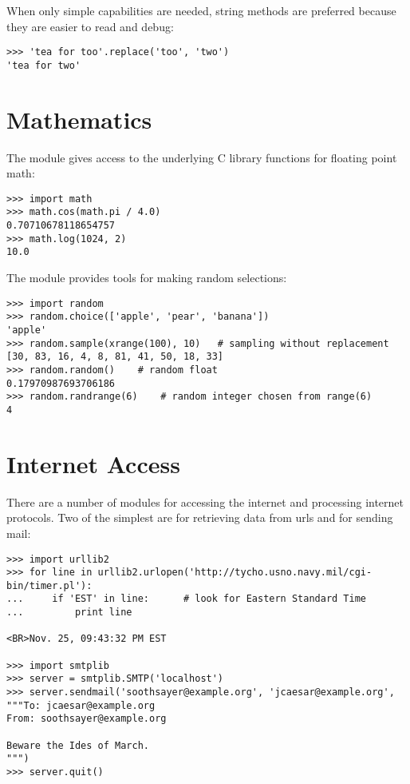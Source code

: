 \documentclass{manual}
\begin{document}
When only simple capabilities are needed, string methods are preferred
because they are easier to read and debug:

\begin{verbatim}
>>> 'tea for too'.replace('too', 'two')
'tea for two'
\end{verbatim}

\section{Mathematics\label{mathematics}}

The  module gives
access to the underlying C library functions for floating point math:

\begin{verbatim}
>>> import math
>>> math.cos(math.pi / 4.0)
0.70710678118654757
>>> math.log(1024, 2)
10.0
\end{verbatim}

The 
module provides tools for making random selections:

\begin{verbatim}
>>> import random
>>> random.choice(['apple', 'pear', 'banana'])
'apple'
>>> random.sample(xrange(100), 10)   # sampling without replacement
[30, 83, 16, 4, 8, 81, 41, 50, 18, 33]
>>> random.random()    # random float
0.17970987693706186
>>> random.randrange(6)    # random integer chosen from range(6)
4   
\end{verbatim}


\section{Internet Access\label{internet-access}}

There are a number of modules for accessing the internet and processing
internet protocols. Two of the simplest are
for retrieving data from urls and
for sending mail:

\begin{verbatim}
>>> import urllib2
>>> for line in urllib2.urlopen('http://tycho.usno.navy.mil/cgi-bin/timer.pl'):
...     if 'EST' in line:      # look for Eastern Standard Time
...         print line
    
<BR>Nov. 25, 09:43:32 PM EST

>>> import smtplib
>>> server = smtplib.SMTP('localhost')
>>> server.sendmail('soothsayer@example.org', 'jcaesar@example.org',
"""To: jcaesar@example.org
From: soothsayer@example.org

Beware the Ides of March.
""")
>>> server.quit()
\end{verbatim}
\end{document}
